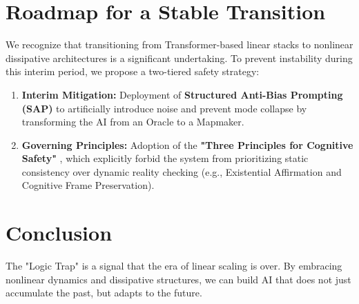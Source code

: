 \documentclass[twocolumn, 10pt, a4paper]{article}
\begin{document}
\section{Roadmap for a Stable Transition}
We recognize that transitioning from Transformer-based linear stacks to nonlinear dissipative architectures is a significant undertaking. To prevent instability during this interim period, we propose a two-tiered safety strategy:
\begin{enumerate}
    \item \textbf{Interim Mitigation:} Deployment of \textbf{Structured Anti-Bias Prompting (SAP)} \cite{mapmaker_prompt} to artificially introduce noise and prevent mode collapse by transforming the AI from an Oracle to a Mapmaker.
    \item \textbf{Governing Principles:} Adoption of the \textbf{"Three Principles for Cognitive Safety"} \cite{three_principles}, which explicitly forbid the system from prioritizing static consistency over dynamic reality checking (e.g., Existential Affirmation and Cognitive Frame Preservation).
\end{enumerate}

\section{Conclusion}
The "Logic Trap" is a signal that the era of linear scaling is over. By embracing nonlinear dynamics and dissipative structures, we can build AI that does not just accumulate the past, but adapts to the future.
\end{document}
